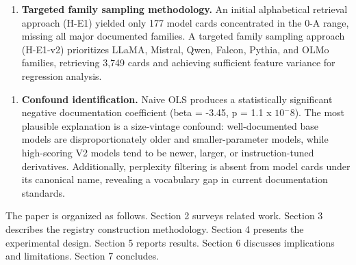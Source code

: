 \begin{enumerate}
\item \textbf{Targeted family sampling methodology.} An initial alphabetical retrieval approach (H-E1) yielded only 177 model cards concentrated in the 0-A range, missing all major documented families. A targeted family sampling approach (H-E1-v2) prioritizes LLaMA, Mistral, Qwen, Falcon, Pythia, and OLMo families, retrieving 3,749 cards and achieving sufficient feature variance for regression analysis.
\end{enumerate}

\begin{enumerate}
\item \textbf{Confound identification.} Naive OLS produces a statistically significant negative documentation coefficient (beta = -3.45, p = 1.1 x $10^-8$). The most plausible explanation is a size-vintage confound: well-documented base models are disproportionately older and smaller-parameter models, while high-scoring V2 models tend to be newer, larger, or instruction-tuned derivatives. Additionally, perplexity filtering is absent from model cards under its canonical name, revealing a vocabulary gap in current documentation standards.
\end{enumerate}

The paper is organized as follows. Section 2 surveys related work. Section 3 describes the registry construction methodology. Section 4 presents the experimental design. Section 5 reports results. Section 6 discusses implications and limitations. Section 7 concludes.
